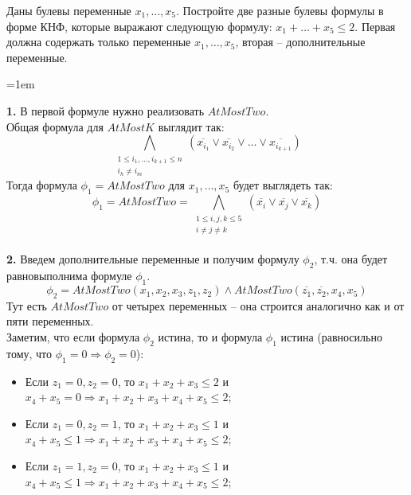 \documentclass[12pt]{extreport}
\theoremstyle{definiton}
\theoremstyle{definition}
\theoremstyle{definition}
\let\leq\leqslant
\newcommand{\solution}[2][\color{myblue}Решение]{
\medskip
	\noindent{\bfseries #1 }{{\color{myblue}\bfseries #2:}}
}
\newenvironment{blockquote}{%
  \par%
  \medskip
  \leftskip=1em%
  \noindent}{%
  \par\medskip}
\begin{document}
	

			
\Pr[10 баллов] Даны булевы переменные $x_1, \dots, x_5$. Постройте две разные булевы формулы в форме КНФ, которые выражают следующую формулу: $x_1 + \dots + x_5 \leq 2$. Первая должна содержать только переменные $x_1, \dots, x_5$, вторая -- дополнительные переменные.
			
	\solution{1}
	\begin{blockquote}
	{\color{myblue}
	\noindent \textbf{1.} В первой формуле нужно реализовать $AtMostTwo$.\\
	Общая формула для $AtMostK$ выглядит так:\\
	$${\bigwedge\limits_{\substack{1 \leq i_1, \dots, i_{k+1} \leq n \\
	i_h \neq i_m}} (\overline{x_{i_1}} \vee \overline{x_{i_2}} \vee \ldots \vee \overline{x_{i_{k+1}}})}$$
	Тогда формула $\phi_1 = AtMostTwo$ для $x_1, \dots, x_5$ будет выглядеть так:
	$$\phi_1 = AtMostTwo = {\bigwedge\limits_{\substack{1 \leq i, j, k \leq 5 \\
	i \neq j \neq k}} (\overline{x_{i}} \vee \overline{x_{j}} \vee \overline{x_{k}})}$$
	\\
	\noindent \textbf{2.} Введем дополнительные переменные и получим формулу $\phi_2$, т.ч. она будет равновыполнима формуле $\phi_1$.
	$$\phi_2 = AtMostTwo(x_1, x_2, x_3, z_1, z_2) \wedge AtMostTwo(\overline{z_1}, \overline{z_2}, x_4, x_5)$$
	Тут есть $AtMostTwo$ от четырех переменных -- она строится аналогично как и от пяти переменных.\\
	Заметим, что если формула $\phi_2$ истина, то и формула $\phi_1$ истина (равносильно тому, что $\phi_1 = 0 \Rightarrow \phi_2 = 0$):
	\begin{itemize}
	    \item Если $z_1 = 0, z_2 = 0$, то $x_1 + x_2 + x_3 \leq 2$ и $x_4 + x_5 = 0 \Rightarrow x_1 + x_2 + x_3 + x_4 + x_5 \leq 2$;
	    \item Если $z_1 = 0, z_2 = 1$, то $x_1 + x_2 + x_3 \leq 1$ и $x_4 + x_5 \leq 1 \Rightarrow x_1 + x_2 + x_3 + x_4 + x_5 \leq 2$;
	    \item Если $z_1 = 1, z_2 = 0$, то $x_1 + x_2 + x_3 \leq 1$ и $x_4 + x_5 \leq 1 \Rightarrow x_1 + x_2 + x_3 + x_4 + x_5 \leq 2$;

\end{itemize}}
\end{blockquote}
\end{document}
